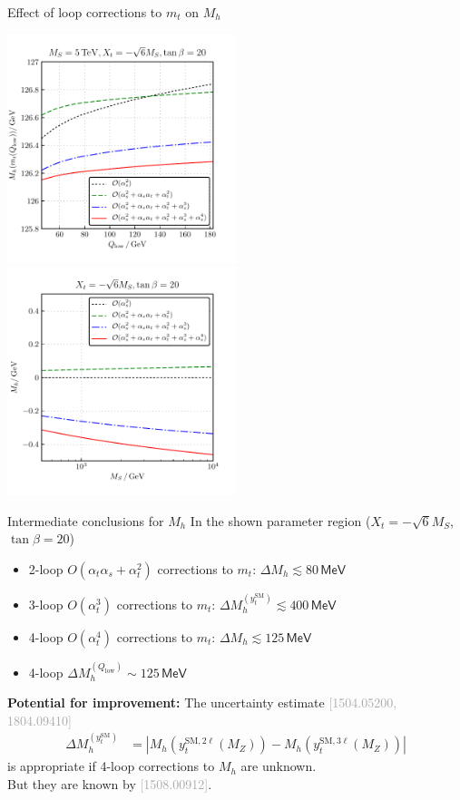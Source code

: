 \documentclass[hyperref={pdfpagelabels=false},ngerman]{beamer}
\newcommand{\eh}[1]{\,\mathsf{#1}}
\newcommand{\MeV}{\eh{MeV}}
\newcommand{\bigcite}[1]{\textcolor{darkgray}{[#1]}}
\renewcommand{\emph}{\textbf}
\newcommand{\SM}{\ensuremath{\text{SM}}}
\newcommand{\at}{\alpha_t}
\newcommand{\as}{\alpha_s}
\newcommand{\Loop}{\ensuremath{\ell}\xspace}
\newcommand{\Qlow}{\ensuremath{Q_\text{low}}}
\newcommand{\DMhHSSUSYytSM}{\ensuremath{\Delta M_h^{(y_t^\SM)}}}
\begin{document}
\begin{frame}{Effect of loop corrections to $m_t$ on $M_h$}
  \begin{center}
    \includegraphics[width=0.5\textwidth]{plots/kuts-10/Mh_Qlow_mt_2L_3LQCD_4LQCD}\hfill
    \includegraphics[width=0.5\textwidth]{plots/kuts-10/DMh_MS_mt_2L_3LQCD_4LQCD}
  \end{center}
\end{frame}

\begin{frame}{Intermediate conclusions for $M_h$}
  In the shown parameter region ($X_t = -\sqrt{6}M_S$, $\tan\beta = 20$)
  \begin{itemize}
  \item 2-loop $O(\at\as + \at^2)$ corrections to $m_t$: $\Delta M_h \lesssim 80\MeV$
  \item 3-loop $O(\at^3)$ corrections to $m_t$: $\DMhHSSUSYytSM \lesssim 400\MeV$
  \item 4-loop $O(\at^4)$ corrections to $m_t$: $\Delta M_h \lesssim 125\MeV$
  \item 4-loop $\Delta M_h^{(\Qlow)} \sim 125\MeV$
  \end{itemize}
  \pause
  \vspace*{1em} \emph{Potential for improvement:} The uncertainty
  estimate \bigcite{1504.05200, 1804.09410}
  \begin{align*}
    \DMhHSSUSYytSM &= \left| M_h(y_t^{\SM,2\Loop}(M_Z)) - M_h(y_t^{\SM,3\Loop}(M_Z)) \right|
  \end{align*}
  is appropriate if 4-loop corrections to $M_h$ are unknown.\\
  But they are known by \bigcite{1508.00912}.
\end{frame}
\end{document}
